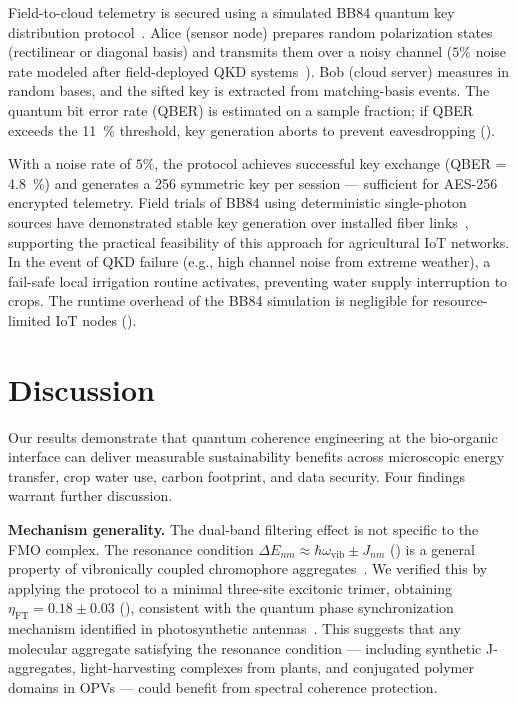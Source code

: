\documentclass[twocolumn]{article}
\begin{document}
Field-to-cloud telemetry is secured using a simulated BB84 quantum key distribution protocol~\cite{Bennett1984}.
Alice (sensor node) prepares random polarization states (rectilinear or diagonal basis) and transmits them over a noisy channel ($5\%$ noise rate modeled after field-deployed QKD systems~\cite{Zahidy2024}).
Bob (cloud server) measures in random bases, and the sifted key is extracted from matching-basis events.
The quantum bit error rate (QBER) is estimated on a sample fraction; if QBER exceeds the \SI{11}{\percent} threshold, key generation aborts to prevent eavesdropping ().

With a noise rate of $5\%$, the protocol achieves successful key exchange (QBER = \SI{4.8}{\percent}) and generates a \SI{256}{\bit} symmetric key per session --- sufficient for AES-256 encrypted telemetry.
Field trials of BB84 using deterministic single-photon sources have demonstrated stable key generation over installed fiber links~\cite{Zahidy2024}, supporting the practical feasibility of this approach for agricultural IoT networks.
In the event of QKD failure (e.g., high channel noise from extreme weather), a fail-safe local irrigation routine activates, preventing water supply interruption to crops.
The runtime overhead of the BB84 simulation is negligible for resource-limited IoT nodes ().


\section*{Discussion}

Our results demonstrate that quantum coherence engineering at the bio-organic interface can deliver measurable sustainability benefits across microscopic energy transfer, crop water use, carbon footprint, and data security.
Four findings warrant further discussion.

\textbf{Mechanism generality.} The dual-band filtering effect is not specific to the FMO complex.
The resonance condition $\Delta E_{nm} \approx \hbar\omega_{\mathrm{vib}} \pm J_{nm}$ () is a general property of vibronically coupled chromophore aggregates~\cite{Chin2013}.
We verified this by applying the protocol to a minimal three-site excitonic trimer, obtaining $\eta_{\mathrm{FT}} = 0.18 \pm 0.03$ (), consistent with the quantum phase synchronization mechanism identified in photosynthetic antennas~\cite{Zhu2024}.
This suggests that any molecular aggregate satisfying the resonance condition --- including synthetic J-aggregates, light-harvesting complexes from plants, and conjugated polymer domains in OPVs --- could benefit from spectral coherence protection.
\end{document}
